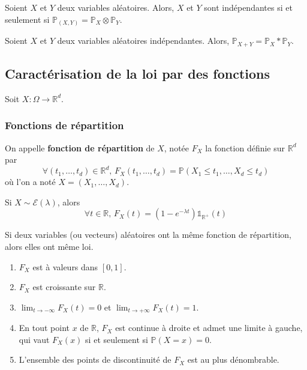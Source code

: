   \begin{theorem}
    Soient $X$ et $Y$ deux variables aléatoires. Alors, $X$ et $Y$ sont indépendantes si et seulement si $\mathbb{P}_{(X,Y)} = \mathbb{P}_X \otimes \mathbb{P}_Y$.
  \end{theorem}

  \begin{corollary}
    Soient $X$ et $Y$ deux variables aléatoires indépendantes. Alors, $\mathbb{P}_{X+Y} = \mathbb{P}_X * \mathbb{P}_Y$.
  \end{corollary}

  \subsection{Caractérisation de la loi par des fonctions}

  Soit $X : \Omega \rightarrow \mathbb{R}^d$.

  \subsubsection{Fonctions de répartition}


  \begin{definition}
    On appelle \textbf{fonction de répartition} de $X$, notée $F_X$ la fonction définie sur $\mathbb{R}^d$ par
    \[ \forall (t_1, \dots, t_d) \in \mathbb{R}^d, \, F_X(t_1, \dots, t_d) = \mathbb{P}(X_1 \leq t_1, \dots, X_d \leq t_d) \]
    où l'on a noté $X = (X_1, \dots, X_d)$.
  \end{definition}


  \begin{example}
    Si $X \sim \mathcal{E}(\lambda)$, alors
    \[ \forall t \in \mathbb{R}, \, F_X(t) = (1 - e^{-\lambda t}) \mathbb{1}_{\mathbb{R}^+}(t) \]
  \end{example}


  \begin{theorem}
    Si deux variables (ou vecteurs) aléatoires ont la même fonction de répartition, alors elles ont même loi.
  \end{theorem}

  \begin{theorem}
    \begin{enumerate}[label={\bfseries(\roman*)}]
      \item $F_X$ est à valeurs dans $[0,1]$.
      \item $F_X$ est croissante sur $\mathbb{R}$.
      \item $\lim_{t \rightarrow -\infty} F_X(t) = 0$ et $\lim_{t \rightarrow +\infty} F_X(t) = 1$.
      \item En tout point $x$ de $\mathbb{R}$, $F_X$ est continue à droite et admet une limite à gauche, qui vaut $F_X(x)$ si et seulement si $\mathbb{P}(X=x) = 0$.
      \item L'ensemble des points de discontinuité de $F_X$ est au plus dénombrable.
    \end{enumerate}
  \end{theorem}

